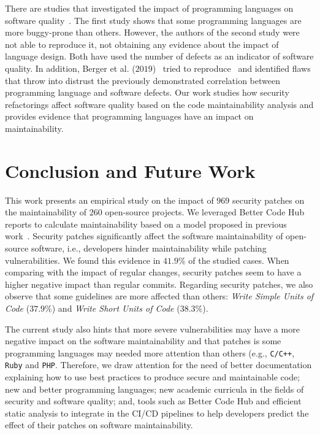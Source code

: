 \documentclass[10pt,conference]{IEEEtran}
\begin{document}
There are studies that investigated the impact of programming languages on software
quality~\cite{Ray:2014:LSS:2635868.2635922,Ray:2017:LSP:3144574.3126905}. The first
study shows that some programming languages are more buggy-prone than others. However,
the authors of the second study were not able to reproduce it, not obtaining any
evidence about the impact of language design. Both have used the number of
defects as an indicator of software quality. In addition,
Berger et al. ($2019$)~\cite{2019arXiv190110220B} tried to reproduce~\cite{Ray:2014:LSS:2635868.2635922,
Ray:2017:LSP:3144574.3126905} and identified flaws that throw into distrust the 
previously demonstrated correlation between programming language and software 
defects. Our work studies how security refactorings affect software quality based 
on the code maintainability analysis and provides evidence that programming languages 
have an impact on maintainability.

\section{Conclusion and Future Work}\label{sec:conclusions}

This work presents an empirical study on the impact of $969$ security
patches on the maintainability of $260$ open-source projects. We leveraged
Better Code Hub reports to calculate maintainability based on a model proposed in previous work~\cite{Olivari:2018, cruz2019energyoriented}. Security patches 
significantly affect the software maintainability of open-source software, i.e., 
developers hinder maintainability while patching vulnerabilities. We found this evidence in
$41.9\%$ of the studied cases. When comparing with the impact of regular changes, security patches seem to have a higher negative impact than regular commits.
Regarding security patches, we also observe that some guidelines are more
affected than others: \emph{Write Simple Units of Code} ($37.9\%$) and
\emph{Write Short Units of Code} ($38.3\%$). 

The current study also hints that more severe vulnerabilities may have
a more negative impact on the software maintainability and that patches
is some programming languages may needed more attention than others (e.g., \texttt{C/C++}, \texttt{Ruby} and \texttt{PHP}. Therefore, 
we draw attention for the need of better documentation explaining 
how to use best practices to produce secure and maintainable code; 
new and better programming languages; new
academic curricula in the fields of security and software quality; and, 
tools such as Better Code Hub and efficient static analysis to integrate
in the CI/CD pipelines to help 
developers predict the effect of their patches on software maintainability.
\end{document}
